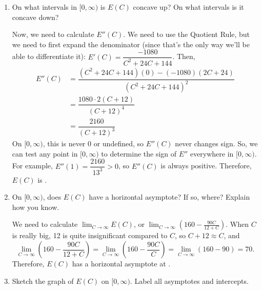\documentclass{article}
\theoremstyle{theorem}
\begin{document}
\begin{enumerate}
\begin{enumerate}
  \item
    \begin{problem}[\vfill\newpage]
      On what intervals in $[0, \infty)$ is $E(C)$ concave up? On what intervals is it concave down?
    \end{problem}

    \begin{solution}
      Now, we need to calculate $E''(C)$. We need to use the Quotient Rule, but we need to first expand the denominator (since that's the only way we'll be able to differentiate it): $E'(C) = \dfrac{- 1080}{C^2 + 24 C + 144}$. Then, 
      \begin{align*}
        E''(C) &= \dfrac{(C^2 + 24 C + 144)(0) - (-1080) (2C + 24)}{(C^2 + 24 C + 144)^2} \\
        &= \dfrac{1080 \cdot 2 (C + 12)}{(C + 12)^4} \\
        &= \dfrac{2160}{(C + 12)^3}
      \end{align*}
      On $[0, \infty)$, this is never 0 or undefined, so $E''(C)$ never changes sign. So, we can test any point in $[0, \infty)$ to determine the sign of $E''$ everywhere in $[0, \infty)$. For example, $E''(1) = \dfrac{2160}{13^3} > 0$, so $E''(C)$ is always positive. Therefore, $E(C)$ is \fbox{concave up on $[0, \infty)$}.
    \end{solution}

  \item \label{timolol-asymptote}
    \begin{problem}[\stretch{0.5}]
      On $[0, \infty)$, does $E(C)$ have a horizontal asymptote? If so, where? Explain how you know.
    \end{problem}

    \begin{solution}
      We need to calculate $\displaystyle \lim_{C \to \infty} E(C)$, or $\displaystyle \lim_{C \to \infty} \left( 160 - \frac{90C}{12 + C} \right)$. When $C$ is really big, 12 is quite insignificant compared to $C$, so $C + 12 \approx C$, and \[ \lim_{C \to \infty} \left( 160 - \frac{90C}{12 + C} \right) = \lim_{C \to \infty} \left( 160 - \frac{90C}{C} \right) = \lim_{C \to \infty} (160 - 90) = 70.\] Therefore, $E(C)$ has a horizontal asymptote at .
    \end{solution}

  \item
    \begin{problem}[\vfill]
      Sketch the graph of $E(C)$ on $[0, \infty)$. Label all asymptotes and intercepts. 
    \end{problem}


\end{enumerate}
\end{enumerate}
\end{document}
